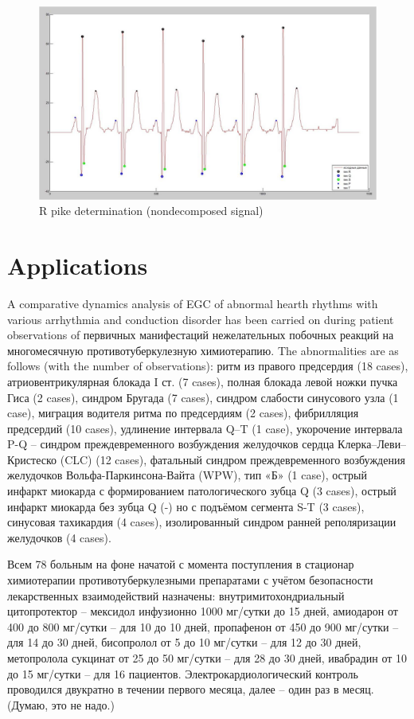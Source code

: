 \documentclass[runningheads]{AIIT}
\newcommand{\nnn}[2][rcolor]{\noindent%
\textcolor{eclr}{}\textcolor{#1}{#2}\textcolor{eclr}{}}
\begin{document}
\begin{figure}[htb]
  \centering
    \includegraphics[width=0.5\linewidth] {images/NonDecomposed.jpg}
  \caption{R pike determination (nondecomposed signal)}
  \label{fig:fig7}
\end{figure}

\section{Applications}
\label{sec:applications}

A comparative dynamics analysis of EGC of \nnn{abnormal} hearth rhythms with various arrhythmia and conduction disorder has been carried on during patient observations of \nnn{первичных манифестаций нежелательных побочных реакций на многомесячную противотуберкулезную химиотерапию}.  The \nnn{abnormalities} are as follows (with the number of observations): ритм из правого предсердия (18 cases), атриовентрикулярная блокада I ст. (7 cases), полная блокада левой ножки пучка Гиса (2 cases), синдром Бругада (7 cases), синдром слабости синусового узла (1 case), миграция водителя ритма по предсердиям (2 cases), фибрилляция предсердий (10 cases), удлинение интервала Q–T (1 case), укорочение интервала P-Q – синдром  преждевременного возбуждения желудочков сердца Клерка–Леви–Кристеско (CLC) (12 cases), фатальный синдром  преждевременного возбуждения желудочков  Вольфа-Паркинсона-Вайта (WPW), тип «Б» (1 case), острый инфаркт миокарда с формированием патологического зубца Q (3 cases), острый инфаркт миокарда без зубца Q (-) но с подъёмом сегмента S-T (3 cases), синусовая тахикардия (4 cases), изолированный синдром ранней реполяризации желудочков (4 cases).

\nnn{Всем 78 больным на фоне начатой с момента поступления в стационар химиотерапии противотуберкулезными препаратами с учётом безопасности лекарственных взаимодействий назначены: внутримитохондриальный цитопротектор – мексидол инфузионно 1000 мг/сутки до 15 дней, амиодарон от 400 до 800 мг/сутки – для 10 до 10 дней, пропафенон от 450 до 900 мг/сутки – для 14 до 30 дней, бисопролол от 5 до 10 мг/сутки – для 12 до 30 дней, метопролола сукцинат от 25 до 50 мг/сутки  – для 28 до 30 дней, ивабрадин от 10 до 15 мг/сутки – для 16 пациентов. Электрокардиологический контроль проводился двукратно в течении первого месяца, далее – один раз в месяц. (Думаю, это не надо.)}
\end{document}
